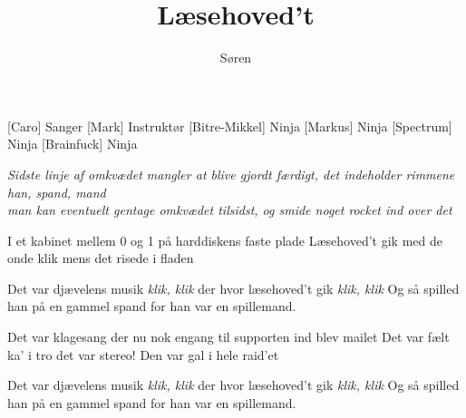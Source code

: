 \documentclass[a4paper,11pt]{article}
\title{Læsehoved't}
\author{Søren}
\begin{document}
\maketitle

\begin{roles}
[Caro] Sanger
[Mark] Instruktør
[Bitre-Mikkel] Ninja
[Markus] Ninja
[Spectrum] Ninja
[Brainfuck] Ninja
\end{roles}

\textit{Sidste linje af omkvædet mangler at blive gjordt færdigt, det indeholder
  rimmene han, spand, mand}
\\
\textit{man kan eventuelt gentage omkvædet tilsidst, og smide noget rocket ind
  over det}

\begin{song}
  I et kabinet
  mellem 0 og 1
  på harddiskens faste plade
  Læsehoved't gik
  med de onde klik
  mens det risede i fladen

  Det var djævelens musik
  \textit{klik, klik}
  der hvor læsehoved't gik
  \textit{klik, klik}
  Og så spilled han på en gammel spand for han var en spillemand. %

  Det var klagesang
  der nu nok engang
  til supporten
  ind blev mailet
  Det var fælt ka' i tro
  det var stereo!
  Den var gal i hele raid'et

  Det var djævelens musik
  \textit{klik, klik}
  der hvor læsehoved't gik
  \textit{klik, klik}
  Og så spilled han på en gammel spand for han var en spillemand. %






\end{song}
\end{document}

